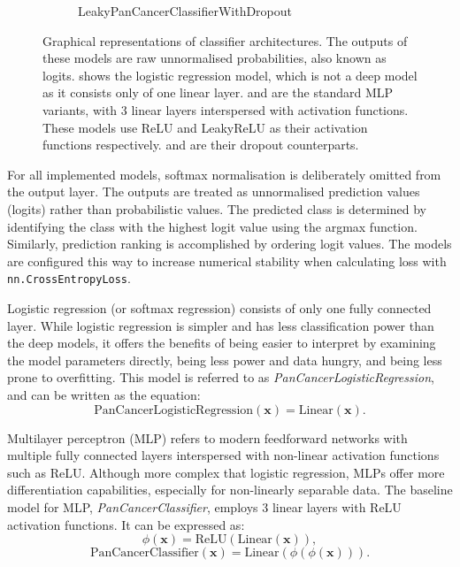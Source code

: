 \documentclass{l4proj}
\begin{document}
\begin{figure}[]
\begin{subfigure}[b]{0.3\textwidth}
        \caption{LeakyPanCancerClassifierWithDropout}
        \label{fig:leakypancancerclassifierdropout}
    \end{subfigure}
    \caption{Graphical representations of classifier architectures. The outputs of these models are raw unnormalised probabilities, also known as logits.  shows the logistic regression model, which is not a deep model as it consists only of one linear layer.  and  are the standard MLP variants, with 3 linear layers interspersed with activation functions. These models use ReLU and LeakyReLU as their activation functions respectively.  and  are their dropout counterparts.
    }\label{fig:classifiers}
\end{figure}

For all implemented models, softmax normalisation is deliberately omitted from the output layer. The outputs are treated as unnormalised prediction values (logits) rather than probabilistic values. The predicted class is determined by identifying the class with the highest logit value using the argmax function. Similarly, prediction ranking is accomplished by ordering logit values. The models are configured this way to increase numerical stability when calculating loss with \verb|nn.CrossEntropyLoss|.

Logistic regression (or softmax regression) consists of only one fully connected layer. While logistic regression is simpler and has less classification power than the deep models, it offers the benefits of being easier to interpret by examining the model parameters directly, being less power and data hungry, and being less prone to overfitting. This model is referred to as \emph{PanCancerLogisticRegression}, and can be written as the equation:
\begin{equation}
    \text{PanCancerLogisticRegression}(\boldsymbol{x}) = \text{Linear}(\boldsymbol{x}).
\end{equation}

Multilayer perceptron (MLP) refers to modern feedforward networks with multiple fully connected layers interspersed with non-linear activation functions such as ReLU. Although more complex that logistic regression, MLPs offer more differentiation capabilities, especially for non-linearly separable data. The baseline model for MLP, \emph{PanCancerClassifier}, employs 3 linear layers with ReLU activation functions. It can be expressed as:
\begin{equation}
    \phi(\boldsymbol{x}) = \text{ReLU}(\text{Linear}(\boldsymbol{x})),
\end{equation}
\begin{equation}
    \text{PanCancerClassifier}(\boldsymbol{x}) = \text{Linear}(\phi(\phi(\boldsymbol{x}))).
\end{equation}
\end{document}
